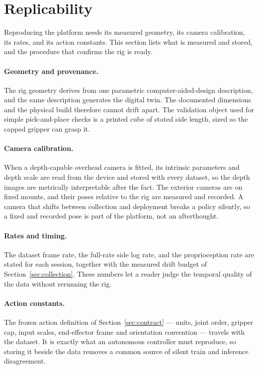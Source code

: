 \section{Replicability}
\label{sec:replicability}

Reproducing the platform needs its measured geometry, its camera
calibration, its rates, and its action constants. This section lists what
is measured and stored, and the procedure that confirms the rig is ready.

\paragraph{Geometry and provenance.} The rig geometry derives from one
parametric computer-aided-design description, and the same description
generates the digital twin. The documented dimensions and the physical
build therefore cannot drift apart. The validation object used for simple
pick-and-place checks is a printed cube of stated side length, sized so the
capped gripper can grasp it.

\paragraph{Camera calibration.} When a depth-capable overhead camera is
fitted, its intrinsic parameters and depth scale are read from the device and
stored with every dataset, so the depth images are metrically interpretable
after the fact. The exterior cameras are on fixed mounts, and their poses relative to
the rig are measured and recorded. A camera that shifts between collection
and deployment breaks a policy silently, so a fixed and recorded pose is
part of the platform, not an afterthought.

\paragraph{Rates and timing.} The dataset frame rate, the full-rate side
log rate, and the proprioception rate are stated for each session, together
with the measured drift budget of Section~\ref{sec:collection}. These
numbers let a reader judge the temporal quality of the data without
rerunning the rig.

\paragraph{Action constants.} The frozen action definition of
Section~\ref{sec:contract} --- units, joint order, gripper cap, input
scales, end-effector frame and orientation convention --- travels with the
dataset. It is exactly what an autonomous controller must reproduce, so
storing it beside the data removes a common source of silent train and
inference disagreement.

